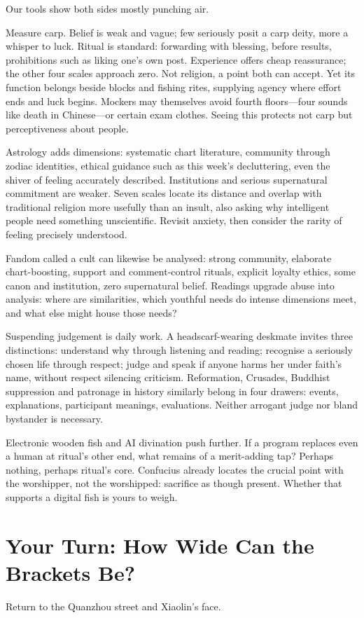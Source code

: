 Our tools show both sides mostly punching air.

Measure carp. Belief is weak and vague; few seriously posit a carp deity, more a whisper to luck. Ritual is standard: forwarding with blessing, before results, prohibitions such as liking one's own post. Experience offers cheap reassurance; the other four scales approach zero. Not religion, a point both can accept. Yet its function belongs beside blocks and fishing rites, supplying agency where effort ends and luck begins. Mockers may themselves avoid fourth floors---four sounds like death in Chinese---or certain exam clothes. Seeing this protects not carp but perceptiveness about people.

Astrology adds dimensions: systematic chart literature, community through zodiac identities, ethical guidance such as this week's decluttering, even the shiver of feeling accurately described. Institutions and serious supernatural commitment are weaker. Seven scales locate its distance and overlap with traditional religion more usefully than an insult, also asking why intelligent people need something unscientific. Revisit anxiety, then consider the rarity of feeling precisely understood.

Fandom called a cult can likewise be analysed: strong community, elaborate chart-boosting, support and comment-control rituals, explicit loyalty ethics, some canon and institution, zero supernatural belief. Readings upgrade abuse into analysis: where are similarities, which youthful needs do intense dimensions meet, and what else might house those needs?

Suspending judgement is daily work. A headscarf-wearing deskmate invites three distinctions: understand why through listening and reading; recognise a seriously chosen life through respect; judge and speak if anyone harms her under faith's name, without respect silencing criticism. Reformation, Crusades, Buddhist suppression and patronage in history similarly belong in four drawers: events, explanations, participant meanings, evaluations. Neither arrogant judge nor bland bystander is necessary.

Electronic wooden fish and AI divination push further. If a program replaces even a human at ritual's other end, what remains of a merit-adding tap? Perhaps nothing, perhaps ritual's core. Confucius already locates the crucial point with the worshipper, not the worshipped: sacrifice as though present. Whether that supports a digital fish is yours to weigh.

\section{Your Turn: How Wide Can the Brackets Be?}
Return to the Quanzhou street and Xiaolin's face.

